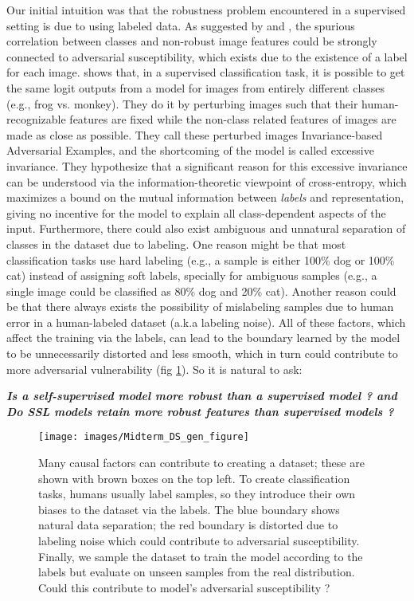 \documentclass[../thesis.tex]{subfiles}
\begin{document}
Our initial intuition was that the robustness problem encountered in a supervised setting is due to using labeled data. As suggested by \cite{features_not_bugs_madry} and \cite{robustness_at_odds_madry}, the spurious correlation between classes and non-robust image features could be strongly connected to adversarial susceptibility, which exists due to the existence of a label for each image. \cite{excessive_invariance} shows that, in a supervised classification task, it is possible to get the same logit outputs from a model for images from entirely different classes (e.g., frog vs. monkey). They do it by perturbing images such that their human-recognizable features are fixed while the non-class related features of images are made as close as possible. They call these perturbed images Invariance-based Adversarial Examples, and the shortcoming of the model is called excessive invariance. They hypothesize that a significant reason
for this excessive invariance can be understood via the information-theoretic viewpoint of cross-entropy, which maximizes a bound on the mutual information between \textit{labels} and representation,
giving no incentive for the model to explain all class-dependent aspects of the input. Furthermore, there could also exist ambiguous and unnatural separation of classes in the dataset due to labeling. One reason might be that most classification tasks use hard labeling (e.g., a sample is either 100\% dog or 100\% cat) instead of assigning soft labels, specially for ambiguous samples (e.g., a single image could be classified as 80\% dog and 20\% cat). Another reason could be that there always exists the possibility of mislabeling samples due to human error in a human-labeled dataset (a.k.a labeling noise). All of these factors, which affect the training via the labels, can lead to the boundary learned by the model to be unnecessarily distorted and less smooth, which in turn could contribute to more adversarial vulnerability (fig \ref{fig:data_seperation_human_labeling_and_training}). So it is natural to ask:

\begin{center}
	\textbf{\textit{ Is a self-supervised model more robust than a supervised model ? and Do SSL models retain more robust features than supervised models ?}}  
\end{center}



\begin{figure}
	\centering
	\texttt{[image: images/Midterm\_DS\_gen\_figure]}
	\caption{Many causal factors can contribute to creating a dataset; these are shown with brown boxes on the top left. To create classification tasks, humans usually label samples, so they introduce their own biases to the dataset via the labels. The blue boundary shows natural data separation; the red boundary is distorted due to labeling noise which could contribute to adversarial susceptibility. Finally, we sample the dataset to train the model according to the labels but evaluate on unseen samples from the real distribution. Could this contribute to model's adversarial susceptibility ?}
	\label{fig:data_seperation_human_labeling_and_training}
\end{figure}
\end{document}
